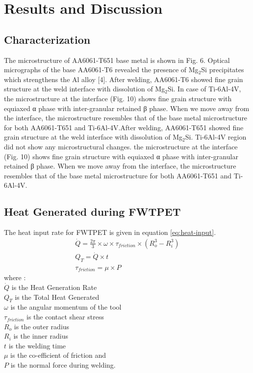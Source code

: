 \documentclass[3p]{elsarticle}
\begin{document}
\section{Results and Discussion}
\label{sec:Results and Discussion}

\subsection{Characterization}
\label{subsec:results-characterization}
The microstructure of AA6061-T651 base metal is shown in Fig. 6. Optical micrographs of the base AA6061-T6 revealed the presence of Mg$_{2}$Si precipitates which strengthens the Al
alloy [4]. After welding, AA6061-T6 showed fine grain structure at the weld interface with dissolution of Mg$_{2}$Si. In case of Ti-6Al-4V, the microstructure at the interface (Fig. 10) shows fine grain structure with equiaxed α phase with inter-granular retained β phase. When we move away from the interface, the
microstructure resembles that of the base metal microstructure for both AA6061-T651 and Ti-6Al-4V.After welding, AA6061-T651 showed fine grain structure at the weld interface with dissolution of Mg$_{2}$Si. Ti-6Al-4V region did not show any microstructural changes. the microstructure at the interface (Fig. 10) shows fine grain structure with equiaxed α phase with inter-granular retained β phase. When we move away from the interface, the microstructure resembles that of the base metal microstructure for both AA6061-T651 and Ti-6Al-4V.

\subsection{Heat Generated during FWTPET}
\label{subsec:Heat Generated during FWTPET}
The heat input rate for FWTPET is given in equation \ref{eq:heat-input}.
\begin{gather} 
\dot{Q} =  \frac{2\pi}{3} \times  \omega \times \tau_{friction} \times (R^{3}_{o} - R^{3}_{i}) \\
Q_{T} = \dot{Q} \times t \label{eq:total-heat-input} \\
\tau_{friction} = \mu \times P \label{eq:Contact-shear-stress}
\end{gather}
where : \\
$\dot{Q}$ is the Heat Generation Rate \\
$Q_{T}$ is the Total Heat Generated \\
$\omega$ is the angular momentum of the tool \\
$\tau_{friction}$ is the contact shear stress \\
$R_{o}$ is the outer radius \\
$R_{i}$ is the inner radius \\
$t$ is the welding time \\
$\mu$ is the co-efficient of friction and\\
$P$ is the normal force during welding.
\end{document}
